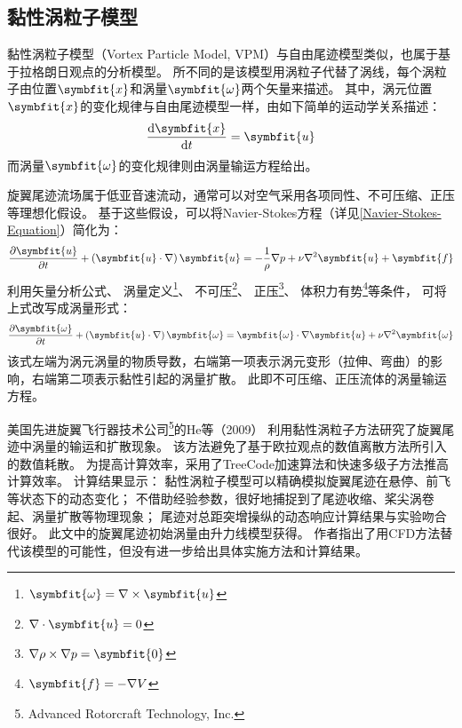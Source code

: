 \subsection{黏性涡粒子模型}\label{Viscous-Vortex-Particle-Method}
黏性涡粒子模型（Vortex Particle Model, VPM）与自由尾迹模型类似，也属于基于拉格朗日观点的分析模型。
所不同的是该模型用涡粒子代替了涡线，每个涡粒子由位置$\symbfit{x}$和涡量$\symbfit{\omega}$两个矢量来描述。
其中，涡元位置$\symbfit{x}$的变化规律与自由尾迹模型一样，由如下简单的运动学关系描述：
\begin{equation}\label{}
\frac{\mathrm{d} \symbfit{x}}{\mathrm{d} t}
=
\symbfit{u}
\end{equation}
而涡量$\symbfit{\omega}$的变化规律则由涡量输运方程给出。

旋翼尾迹流场属于低亚音速流动，通常可以对空气采用各项同性、不可压缩、正压等理想化假设。
基于这些假设，可以将Navier-Stokes方程（详见\ref{Navier-Stokes-Equation}）简化为：
\begin{equation}\label{}
\frac{\partial \symbfit{u}}{\partial t}
+
\left( \symbfit{u}\cdot\nabla \right) \symbfit{u}
=
-\frac{1}{\rho} \nabla p
+
\nu \nabla^2 \symbfit{u}
+
\symbfit{f}
\end{equation}
利用矢量分析公式、%
涡量定义\footnote{$\symbfit{\omega}=\nabla\times  \symbfit{u}$}、
不可压\footnote{$\nabla\cdot  \symbfit{u} = 0$}、
正压\footnote{$\nabla \rho \times \nabla p = \symbfit{0}$}、
体积力有势\footnote{$ \symbfit{f} = -\nabla V  $}等条件，
可将上式改写成涡量形式：
\begin{equation}\label{Vorticity-Transport-Equation}
\frac{\partial \symbfit{\omega}}{\partial t}
+
\left( \symbfit{u}\cdot\nabla \right) \symbfit{\omega}
=
\symbfit{\omega} \cdot \nabla\symbfit{u}
+
\nu \nabla^2 \symbfit{\omega}
\end{equation}
该式左端为涡元涡量的物质导数，右端第一项表示涡元变形（拉伸、弯曲）的影响，右端第二项表示黏性引起的涡量扩散。
此即不可压缩、正压流体的涡量输运方程。

美国先进旋翼飞行器技术公司\footnote{Advanced Rotorcraft Technology, Inc.}的He等（2009）
利用黏性涡粒子方法研究了旋翼尾迹中涡量的输运和扩散现象。
该方法避免了基于欧拉观点的数值离散方法所引入的数值耗散。
为提高计算效率，采用了TreeCode加速算法和快速多级子方法推高计算效率。
计算结果显示：
黏性涡粒子模型可以精确模拟旋翼尾迹在悬停、前飞等状态下的动态变化；
不借助经验参数，很好地捕捉到了尾迹收缩、桨尖涡卷起、涡量扩散等物理现象；
尾迹对总距突增操纵的动态响应计算结果与实验吻合很好。
此文中的旋翼尾迹初始涡量由升力线模型获得。
作者指出了用CFD方法替代该模型的可能性，但没有进一步给出具体实施方法和计算结果。

